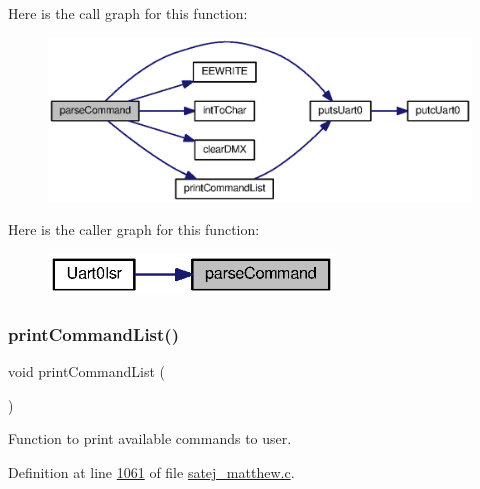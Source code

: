 Here is the call graph for this function\+:
\nopagebreak
\begin{figure}[H]
\begin{center}
\leavevmode
\includegraphics[width=350pt]{satej__matthew_8c_a784ef656236362513864c6ba3507e22d_cgraph}
\end{center}
\end{figure}
Here is the caller graph for this function\+:
\nopagebreak
\begin{figure}[H]
\begin{center}
\leavevmode
\includegraphics[width=215pt]{satej__matthew_8c_a784ef656236362513864c6ba3507e22d_icgraph}
\end{center}
\end{figure}
\mbox{\label{satej__matthew_8c_a9657c6b2d1c183503ca49b71da13e9e4}} 
\subsubsection{\texorpdfstring{printCommandList()}{printCommandList()}}
{\footnotesize\ttfamily void print\+Command\+List (\begin{DoxyParamCaption}{ }\end{DoxyParamCaption})}



Function to print available commands to user. 



Definition at line \mbox{\hyperlink{satej__matthew_8c_source_l01061}{1061}} of file \mbox{\hyperlink{satej__matthew_8c_source}{satej\+\_\+matthew.\+c}}.

